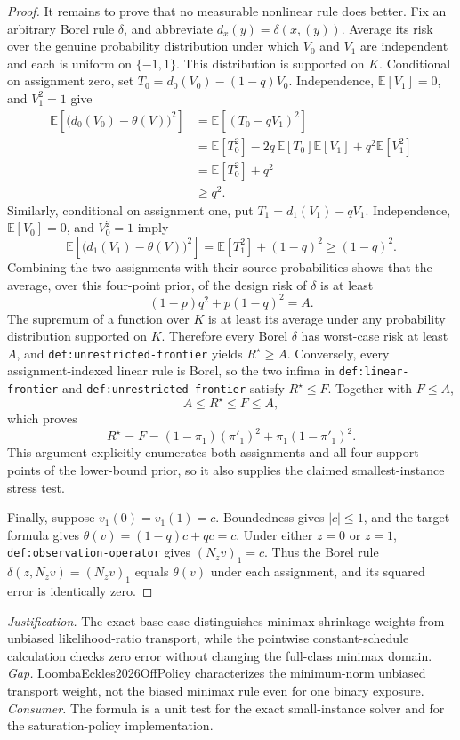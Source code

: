 \documentclass{article}
\begin{document}
\begin{proof}
It remains to prove that no measurable nonlinear rule does better. Fix an arbitrary Borel rule \(\delta\), and abbreviate \(d_x(y)=\delta(x,(y))\). Average its risk over the genuine probability distribution under which \(V_0\) and \(V_1\) are independent and each is uniform on \(\{-1,1\}\). This distribution is supported on \(K\). Conditional on assignment zero, set \(T_0=d_0(V_0)-(1-q)V_0\). Independence, \(\mathbb E[V_1]=0\), and \(V_1^2=1\) give
\[
\begin{aligned}
\mathbb E\!\left[\bigl(d_0(V_0)-\theta(V)\bigr)^2\right]
&=\mathbb E\!\left[(T_0-qV_1)^2\right]\\
&=\mathbb E[T_0^2]-2q\,\mathbb E[T_0]\mathbb E[V_1]+q^2\mathbb E[V_1^2]\\
&=\mathbb E[T_0^2]+q^2\\
&\ge q^2.
\end{aligned}
\]
Similarly, conditional on assignment one, put \(T_1=d_1(V_1)-qV_1\). Independence, \(\mathbb E[V_0]=0\), and \(V_0^2=1\) imply
\[
\mathbb E\!\left[\bigl(d_1(V_1)-\theta(V)\bigr)^2\right]
=\mathbb E[T_1^2]+(1-q)^2
\ge(1-q)^2.
\]
Combining the two assignments with their source probabilities shows that the average, over this four-point prior, of the design risk of \(\delta\) is at least
\[
(1-p)q^2+p(1-q)^2=A.
\]
The supremum of a function over \(K\) is at least its average under any probability distribution supported on \(K\). Therefore every Borel \(\delta\) has worst-case risk at least \(A\), and \texttt{def:unrestricted-frontier} yields \(R^{\star}\ge A\). Conversely, every assignment-indexed linear rule is Borel, so the two infima in \texttt{def:linear-frontier} and \texttt{def:unrestricted-frontier} satisfy \(R^{\star}\le F\). Together with \(F\le A\),
\[
A\le R^{\star}\le F\le A,
\]
which proves
\[
R^{\star}=F=(1-\pi_1)(\pi'_1)^2+\pi_1(1-\pi'_1)^2.
\]
This argument explicitly enumerates both assignments and all four support points of the lower-bound prior, so it also supplies the claimed smallest-instance stress test.

Finally, suppose \(v_1(0)=v_1(1)=c\). Boundedness gives \(|c|\le1\), and the target formula gives \(\theta(v)=(1-q)c+qc=c\). Under either \(z=0\) or \(z=1\), \texttt{def:observation-operator} gives \((N_zv)_1=c\). Thus the Borel rule \(\delta(z,N_zv)=(N_zv)_1\) equals \(\theta(v)\) under each assignment, and its squared error is identically zero.
\end{proof}
\par\smallskip\noindent \textit{Justification.} The exact base case distinguishes minimax shrinkage weights from unbiased likelihood-ratio transport, while the pointwise constant-schedule calculation checks zero error without changing the full-class minimax domain. \textit{Gap.} LoombaEckles2026OffPolicy characterizes the minimum-norm unbiased transport weight, not the biased minimax rule even for one binary exposure. \textit{Consumer.} The formula is a unit test for the exact small-instance solver and for the saturation-policy implementation.
\end{document}
